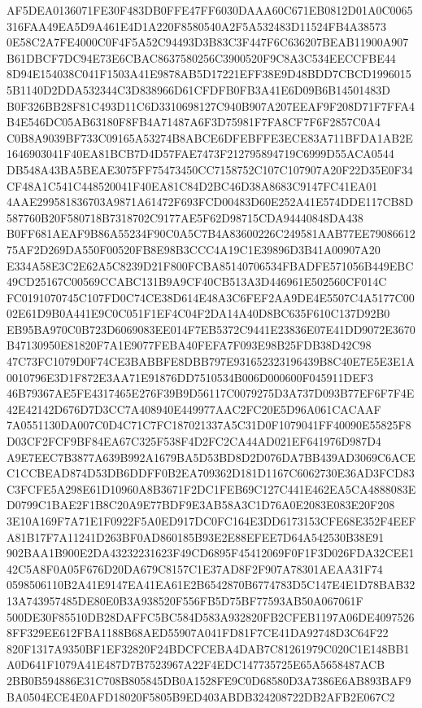 \documentclass[UTF8,fontset=fandol,zihao=-4,a4paper]{ctexart}
\begin{document}
{{AF5DEA0136071FE30F483DB0FFE47FF6030DAAA60C671EB0812D01A0C0065316FAA49EA5D9A461E4D1A220F8580540A2F5A532483D11524FB4A38573
0E58C2A7FE4000C0F4F5A52C94493D3B83C3F447F6C636207BEAB11900A907B61DBCF7DC94E73E6CBAC8637580256C3900520F9C8A3C534EECCFBE44
8D94E154038C041F1503A41E9878AB5D17221EFF38E9D48BDD7CBCD19960155B1140D2DDA532344C3D838966D61CFDFB0FB3A41E6D09B6B14501483D
B0F326BB28F81C493D11C6D3310698127C940B907A207EEAF9F208D71F7FFA4B4E546DC05AB63180F8FB4A71487A6F3D75981F7FA8CF7F6F2857C0A4
C0B8A9039BF733C09165A53274B8ABCE6DFEBFFE3ECE83A711BFDA1AB2E1646903041F40EA81BCB7D4D57FAE7473F212795894719C6999D55ACA0544
DB548A43BA5BEAE3075FF75473450CC7158752C107C107907A20F22D35E0F34CF48A1C541C448520041F40EA81C84D2BC46D38A8683C9147FC41EA01
4AAE299581836703A9871A61472F693FCD00483D60E252A41E574DDE117CB8D587760B20F580718B7318702C9177AE5F62D98715CDA94440848DA438
B0FF681AEAF9B86A55234F90C0A5C7B4A83600226C249581AAB77EE7908661275AF2D269DA550F00520FB8E98B3CCC4A19C1E39896D3B41A00907A20
E334A58E3C2E62A5C8239D21F800FCBA85140706534FBADFE571056B449EBC49CD25167C00569CCABC131B9A9CF40CB513A3D446961E502560CF014C
FC0191070745C107FD0C74CE38D614E48A3C6FEF2AA9DE4E5507C4A5177C0002E61D9B0A441E9C0C051F1EF4C04F2DA14A40D8BC635F610C137D92B0
EB95BA970C0B723D6069083EE014F7EB5372C9441E23836E07E41DD9072E3670B47130950E81820F7A1E9077FEBA40FEFA7F093E98B25FDB38D42C98
47C73FC1079D0F74CE3BABBFE8DBB797E931652323196439B8C40E7E5E3E1A0010796E3D1F872E3AA71E91876DD7510534B006D000600F045911DEF3
46B79367AE5FE4317465E276F39B9D56117C0079275D3A737D093B77EF6F7F4E42E42142D676D7D3CC7A408940E449977AAC2FC20E5D96A061CACAAF
7A0551130DA007C0D4C71C7FC187021337A5C31D0F1079041FF40090E55825F8D03CF2FCF9BF84EA67C325F538F4D2FC2CA44AD021EF641976D987D4
A9E7EEC7B3877A639B992A1679BA5D53BD8D2D076DA7BB439AD3069C6ACEC1CCBEAD874D53DB6DDFF0B2EA709362D181D1167C6062730E36AD3FCD83
C3FCFE5A298E61D10960A8B3671F2DC1FEB69C127C441E462EA5CA4888083ED0799C1BAE2F1B8C20A9E77BDF9E3AB58A3C1D76A0E2083E083E20F208
3E10A169F7A71E1F0922F5A0ED917DC0FC164E3DD6173153CFE68E352F4EEFA81B17F7A11241D263BF0AD860185B93E2E88EFEE7D64A542530B38E91
902BAA1B900E2DA43232231623F49CD6895F45412069F0F1F3D026FDA32CEE142C5A8F0A05F676D20DA679C8157C1E37AD8F2F907A78301AEAA31F74
0598506110B2A41E9147EA41EA61E2B6542870B6774783D5C147E4E1D78BAB3213A743957485DE80E0B3A938520F556FB5D75BF77593AB50A067061F
500DE30F85510DB28DAFFC5BC584D583A932820FB2CFEB1197A06DE40975268FF329EE612FBA1188B68AED55907A041FD81F7CE41DA92748D3C64F22
820F1317A9350BF1EF32820F24BDCFCEBA4DAB7C81261979C020C1E148BB1A0D641F1079A41E487D7B7523967A22F4EDC147735725E65A5658487ACB
2BB0B594886E31C708B805845DB0A1528FE9C0D68580D3A7386E6AB893BAF9BA0504ECE4E0AFD18020F5805B9ED403ABDB324208722DB2AFB2E067C2
}}
\end{document}
